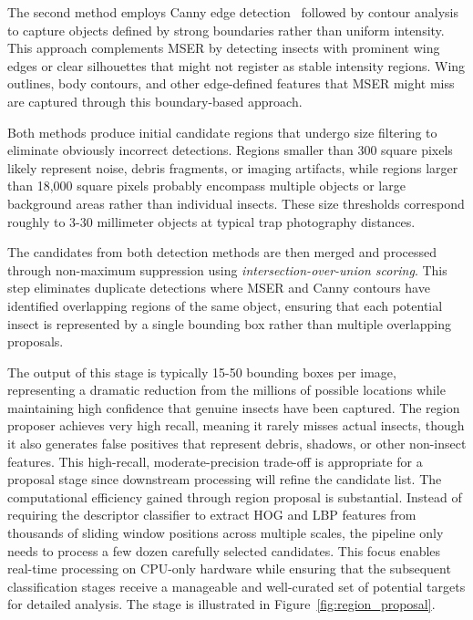 \documentclass[11pt, a4paper]{article}
\begin{document}
The second method employs Canny edge detection~\cite{canny} followed by contour analysis to capture objects defined by strong 
boundaries rather than uniform intensity. This approach complements MSER by detecting insects with prominent wing edges or clear 
silhouettes that might not register as stable intensity regions. Wing outlines, body contours, and other edge-defined features that 
MSER might miss are captured through this boundary-based approach.

Both methods produce initial candidate regions that undergo size filtering to eliminate obviously incorrect detections. Regions 
smaller than 300 square pixels likely represent noise, debris fragments, or imaging artifacts, while regions larger than 18,000 square 
pixels probably encompass multiple objects or large background areas rather than individual insects. These size thresholds correspond 
roughly to 3-30 millimeter objects at typical trap photography distances.

The candidates from both detection methods are then merged and processed through non-maximum suppression using \emph{intersection-over-union 
scoring}. This step eliminates duplicate detections where MSER and Canny contours have identified overlapping regions of the same object, ensuring that each potential insect is represented by a single bounding box rather than multiple overlapping proposals.

The output of this stage is typically 15-50 bounding boxes per image, representing a dramatic reduction from the millions of possible locations while maintaining high confidence that genuine insects have been captured. The region proposer achieves very high recall, meaning it rarely misses actual insects, though it also generates false positives that represent debris, shadows, or other non-insect features. This high-recall, moderate-precision trade-off is appropriate for a proposal stage since downstream processing will refine the candidate list.
The computational efficiency gained through region proposal is substantial. Instead of requiring the descriptor classifier to 
extract HOG and LBP features from thousands of sliding window positions across multiple scales, the pipeline only needs to process 
a few dozen carefully selected candidates. This focus enables real-time processing on CPU-only hardware while ensuring that the subsequent classification stages receive a manageable and well-curated set of potential targets for detailed analysis. The stage is illustrated in 
Figure~\ref{fig:region_proposal}.
\end{document}
